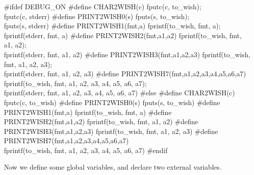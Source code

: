#ifdef DEBUG_ON
#define CHAR2WISH(c)                    fputc(c, to_wish); \\
                                        fputc(c, stderr)
#define PRINT2WISH0(s)                  fputs(s, to_wish); \\
                                        fputs(s, stderr)
#define PRINT2WISH1(fmt,a)              fprintf(to_wish, fmt, a); \\
                                        fprintf(stderr, fmt, a)
#define PRINT2WISH2(fmt,a1,a2)          fprintf(to_wish, fmt, a1, a2); \\
                                        fprintf(stderr, fmt, a1, a2)
#define PRINT2WISH3(fmt,a1,a2,a3)       fprintf(to_wish, fmt, a1, a2, a3); \\
                                        fprintf(stderr, fmt, a1, a2, a3)
#define PRINT2WISH7(fmt,a1,a2,a3,a4,a5,a6,a7) \\
                fprintf(to_wish, fmt, a1, a2, a3, a4, a5, a6, a7); \\
                fprintf(stderr, fmt, a1, a2, a3, a4, a5, a6, a7)
#else
#define CHAR2WISH(c)                    fputc(c, to_wish)
#define PRINT2WISH0(s)                  fputs(s, to_wish)
#define PRINT2WISH1(fmt,a)              fprintf(to_wish, fmt, a)
#define PRINT2WISH2(fmt,a1,a2)          fprintf(to_wish, fmt, a1, a2)
#define PRINT2WISH3(fmt,a1,a2,a3)       fprintf(to_wish, fmt, a1, a2, a3)
#define PRINT2WISH7(fmt,a1,a2,a3,a4,a5,a6,a7) \\
                fprintf(to_wish, fmt, a1, a2, a3, a4, a5, a6, a7)
#endif
\nwendcode{}\nwdocspar


Now we define some global variables, and declare two external variables.

